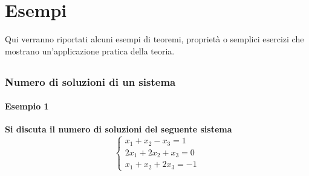 
\section{Esempi}%
\label{sec:esempi}

Qui verranno riportati alcuni esempi di teoremi, proprietà o semplici esercizi che
mostrano un'applicazione pratica della teoria.

\subsection{}%

\subsection{}%

\subsubsection{Numero di soluzioni di un sistema}%
\label{ssub:numero_di_soluzioni_di_un_sistema}

\paragraph{Esempio 1}%

\textbf{Si discuta il numero di soluzioni del seguente sistema}
\begin{equation*}
  \begin{cases}
    x_1+x_2-x_3 = 1\\
    2x_1+2x_2+x_3=0\\
    x_1+x_2+2x_3=-1
  \end{cases}
\end{equation*}

